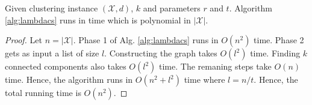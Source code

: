 \documentclass[11pt]{article}
\newcommand{\mc}{\mathcal}
\begin{document}
\begin{theorem}
Given clustering instance $(\mc X, d)$, $k$ and parameters $r$ and $t$. Algorithm \ref{alg:lambdacs} runs in time which is polynomial in $|\mc X|$.
\end{theorem}

\begin{proof}
Let $n = |\mc X|$. Phase 1 of Alg. \ref{alg:lambdacs} runs in $O(n^2)$ time. Phase 2 gets as input a list of size $l$. Constructing the graph takes $O(l^2)$ time. Finding $k$ connected components also takes $O(l^2)$ time. The remaning steps take $O(n)$ time. Hence, the algorithm runs in $O(n^2 + l^2)$ time where $l = n/t$. Hence, the total running time is $O(n^2)$.
\end{proof}


\end{document}

